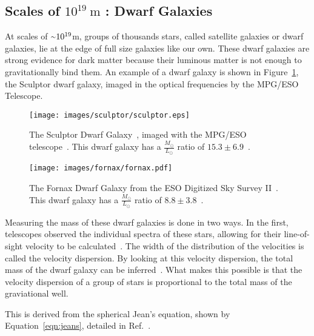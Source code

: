 \subsection{Scales of $10^{19}\:\text{m}$ : Dwarf Galaxies}\label{dm_dwarfscale}
At scales of $\nicetilde 10^{19}$m, groups of thousands stars, called satellite galaxies or dwarf galaxies, lie at the edge of full size galaxies like our own.
These dwarf galaxies are strong evidence for dark matter because their luminous matter is not enough to gravitationally bind them.
An example of a dwarf galaxy is shown in Figure~\ref{fig:sculptor}, the Sculptor dwarf galaxy, imaged in the optical frequencies by the MPG/ESO Telescope.

\begin{figure}[h]
  \centering
  \texttt{[image: images/sculptor/sculptor.eps]}
  \caption[Sculptor Dwarf Galaxy]{
    The Sculptor Dwarf Galaxy~\cite{sculptor_image}, imaged with the MPG/ESO telescope~\cite{sculptor_paper}.
    This dwarf galaxy has a $\frac{M_\odot}{L_\odot}$ ratio of $15.3\pm6.9$~\cite{sculptor_ml}.
  }
  \label{fig:sculptor}
\end{figure}

\begin{figure}[h]
  \centering
  \texttt{[image: images/fornax/fornax.pdf]}
  \caption[Fornax Dwarf Galaxy]{
    The Fornax Dwarf Galaxy from the ESO Digitized Sky Survey II~\cite{fornax_image}.
    This dwarf galaxy has a $\frac{M_\odot}{L_\odot}$ ratio of $8.8\pm3.8$~\cite{sculptor_ml}.
  }
  \label{fig:fornax}
\end{figure}

Measuring the mass of these dwarf galaxies is done in two ways.
In the first, telescopes observed the individual spectra of these stars, allowing for their line-of-sight velocity to be calculated~\cite{dwarf_gal_red_giant}.
The width of the distribution of the velocities is called the velocity dispersion.
By looking at this velocity dispersion, the total mass of the dwarf galaxy can be inferred~\cite{dwarf_gal_vel_dispersion, dwarf_gal_vel_dispersion2}.
What makes this possible is that the velocity dispersion of a group of stars is proportional to the total mass of the graviational well.

This is derived from the spherical Jean's equation, shown by Equation~\ref{eqn:jeans}, detailed in Ref.~\cite{galactic_dynamics}.

